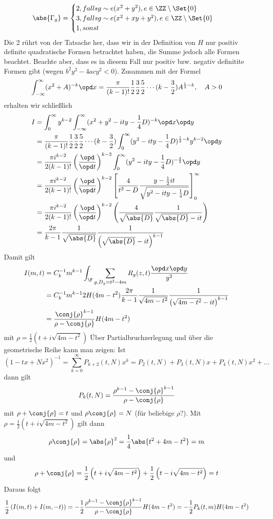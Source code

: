 \begin{bewe}
\[
	\abs{\Gamma_g} = \begin{cases}
	2, falls g \sim e(x^2 + y^2), e \in \ZZ \setminus \Set {0} \\
	3, falls g \sim e(x^2 + xy + y^2), e \in \ZZ \setminus \Set {0}	\\
	1, sonst
	\end{cases}
\]
Die 2 rührt von der Tatsache her, dass wir in der Definition von $H$ nur positiv definite quadratische Formen betrachtet haben, die Summe jedoch alle Formen beachtet. Beachte aber, dass es in diesem Fall nur positiv bzw. negativ definitite Formen gibt (wegen $b^2y^2 - 4acy^2 < 0$). Zusammen mit der Formel
\[
	\int_{-\infty}^\infty (x^2 + A)^{-k} \opd x = \frac \pi{(k-1)!} \frac 12 \frac 32 \frac 52 \cdots (k-\frac 32) A^{\frac 12 -k}, \quad A > 0
\]
erhalten wir schließlich
\begin{align*}
	I &= \int_0^\infty y^{k-2} \int_{-\infty}^\infty (x^2 + y^2 - ity - \frac 14 D)^{-k} \opd x \opd y \\
	&= \frac \pi{(k-1)!} \frac 12 \frac 32 \frac 52 \cdots (k-\frac 32) \int_0^\infty (y^2 - ity - \frac 14 D)^{\frac 12 - k} y^{k-2} \opd y \\
	&= \frac{\pi i^{k-2}}{2(k-1)!} \left( \frac {\opd}{\opd t} \right)^{k-2} \int_0^\infty (y^2 - ity - \frac 14D)^{-\frac 32} \opd y \\
	&= \frac{\pi i^{k-2}}{2(k-1)!} \left( \frac {\opd}{\opd t} \right)^{k-2} \left[ \frac{4}{t^2 - D} \frac{y - \frac 12 it}{\sqrt{y^2 - ity - \frac 14 D}} \right]_0^\infty \\
	&= \frac{\pi i^{k-2}}{2(k-1)!} \left( \frac {\opd}{\opd t} \right)^{k-2} \left( \frac 4{\sqrt{\abs{D}}} \frac 1{\sqrt{\abs{D}} - it} \right) \\
	&= \frac {2\pi}{k-1} \frac 1{\sqrt{\abs{D}}} \frac 1{\left( \sqrt{\abs{D}} - it \right)^{k-1}}
\end{align*}
Damit gilt
\begin{align*}
	I(m, t) &= C_k^{-1} m^{k-1} \int_\F \sum_{g, D_g = t^2-4m} R_g(z,t) \frac {\opd x \opd y}{y^2} \\
	&= C_k^{-1} m^{k-1} 2 H (4m-t^2) \frac {2\pi}{k-1} \frac 1{\sqrt{4m-t^2}} \frac 1{\left( \sqrt{4m-t^2} - it \right)^{k-1}} \\
	&= \frac{\conj{\rho}^{k-1}}{\rho - \conj{\rho}} H(4m-t^2)
\end{align*}
mit $\rho = \frac 12 \left( t + i \sqrt{4m-t^2} \right)$
Über Partialbruchzerlegung und über die geometrische Reihe kann man zeigen: Ist
\[
	(1 - tx + Nx^2)^{-1} = \sum_{k=0}^\infty P_{k+2}(t,N)x^k = P_2(t,N) + P_3(t,N)x + P_4(t,N)x^2 + \ldots
\]
dann gilt
\[
	P_k(t,N) = \frac{\rho^{k-1} - \conj{\rho}^{k-1}}{\rho - \conj{\rho}}
\]
mit $\rho + \conj{\rho} = t$ und $\rho \conj{\rho} = N$ (für beliebige $\rho$?). Mit $\rho = \frac 12 \left( t + i \sqrt{4m-t^2} \right)$ gilt dann
\[
	\rho \conj{\rho} = \abs{\rho}^2 = \frac 14 \abs{t^2 + 4m - t^2} = m
\]
und 
\[
	\rho + \conj{\rho} = \frac 12 \left( t + i \sqrt{4m-t^2} \right) + \frac 12 \left( t - i \sqrt{4m-t^2} \right) = t
\]
Daraus folgt
\[
	\frac 12 \left( I(m,t) + I(m,-t) \right) = - \frac 12 \frac{\rho^{k-1} - \conj{\rho}^{k-1}}{\rho - \conj{\rho}} H(4m-t^2) = - \frac 12 P_k(t,m) H(4m-t^2)
\]


\end{bewe}
